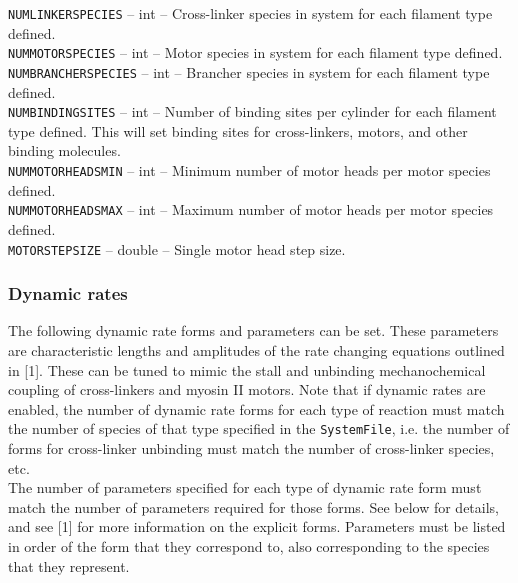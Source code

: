 \documentclass[11pt, oneside]{article}   	%
\begin{document}
      \noindent\texttt{NUMLINKERSPECIES} -- int -- Cross-linker species in system for each filament type defined.  \\
   
       \noindent\texttt{NUMMOTORSPECIES} -- int -- Motor species in system for each filament type defined. \\
   
       \noindent\texttt{NUMBRANCHERSPECIES} -- int -- Brancher species in system for each filament type defined. \\
   
       \noindent\texttt{NUMBINDINGSITES} -- int -- Number of binding sites per cylinder for each filament type defined. 
       This will set binding sites for cross-linkers, motors, and other binding molecules. \\
   
       \noindent\texttt{NUMMOTORHEADSMIN} -- int -- Minimum number of motor heads per motor species defined. \\
     
       \noindent\texttt{NUMMOTORHEADSMAX} -- int -- Maximum number of motor heads per motor species defined. \\
     
       \noindent\texttt{MOTORSTEPSIZE} -- double -- Single motor head step size. \\
     

\normalsize

\subsubsection{Dynamic rates}

The following dynamic rate forms and parameters can be set. These parameters are characteristic lengths and amplitudes of the rate changing equations outlined in [1]. These can be tuned to mimic the stall and unbinding mechanochemical coupling of cross-linkers and myosin II motors. Note that if dynamic rates are enabled, the number of dynamic rate forms for each type of reaction must match the number of species of that type specified in the \texttt{SystemFile}, i.e. the number of forms for cross-linker unbinding must match the number of cross-linker species, etc.\\

\noindent The number of parameters specified for each type of dynamic rate form must match the number of parameters required for those forms. See below for details, and see [1] for more information on the explicit forms. Parameters must be listed in order of the form that they correspond to, also corresponding to the species that they represent.\\
\end{document}
